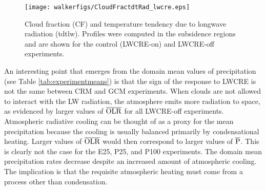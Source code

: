\documentclass[draft]{agujournal2019}
\begin{document}
{\begin{figure}
  \centering
      \texttt{[image: walkerfigs/CloudFractdtRad\_lwcre.eps]}
  \caption{Cloud fraction (CF) and temperature tendency due to longwave radiation (tdtlw).  Profiles were computed in the 
  subsidence regions and are shown for the control (LWCRE-on) and LWCRE-off experiments.}
  \label{fig:cf_tdtlw}
\end{figure}

An interesting point that emerges from the domain mean values of precipitation (see Table \ref{tab:experimentmeans}) 
is that the sign of the response to LWCRE is not the same between CRM and GCM experiments.
When clouds are not allowed to interact with the LW radiation, the atmosphere 
emits more radiation to space, as evidenced by larger values of $\overline{\rm{OLR}}$ 
for all LWCRE-off experiments.  Atmospheric radiative cooling can be thought of 
as a proxy for the mean precipitation because the cooling is usually balanced primarily by 
condensational heating.  Larger values of $\overline{\rm{OLR}}$ would then correspond to 
larger values of $\overline{\rm{P}}$.  This is clearly not the case for the E25, P25, and 
P100 experiments.   The domain mean precipitation rates decrease despite an increased 
amount of atmospheric cooling.  The implication is that the requisite atmospheric heating 
must come from a process other than condensation.  

}
\end{document}
